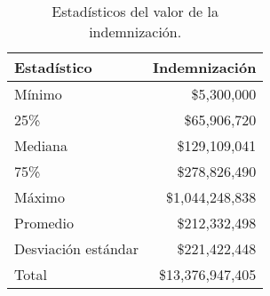 \begin{table}[!htbp]
\centering
\caption{Estadísticos del valor de la indemnización.} 
\label{tab:indemnizacion}
\begin{tabular}{lr}
  \hline
Estadístico & Indemnización \\ 
  \hline
Mínimo & \$5,300,000 \\ 
  25\% & \$65,906,720 \\ 
  Mediana & \$129,109,041 \\ 
  75\% & \$278,826,490 \\ 
  Máximo & \$1,044,248,838 \\ 
  Promedio & \$212,332,498 \\ 
  Desviación estándar & \$221,422,448 \\ 
  Total & \$13,376,947,405 \\ 
   \hline
\end{tabular}
\end{table}
